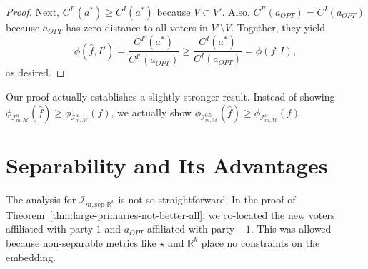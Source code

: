 \documentclass[letterpaper]{article} %
\theoremstyle{definition}
\renewcommand{\hat}{\widehat}
\newcommand{\bbR}{\mathbb{R}}
\newcommand{\calI}{\mathcal{I}}
\newcommand{\calM}{\mathcal{M}}
\newcommand{\pleft}{-1}
\newcommand{\pright}{1}
\newcommand{\all}{\star}
\newcommand{\sep}{\textrm{sep-}}
\newcommand{\euc}[1]{\bbR^{#1}}
\newcommand{\eucsep}[1]{\sep\euc{#1}}
\newcommand{\I}{\calI}
\begin{document}
\begin{proof}
	Next, $C^{I'}(a^*) \ge C^I(a^*)$ because $V \subset V'$. Also, $C^{I'}(a_{OPT}) = C^I(a_{OPT})$ because $a_{OPT}$ has zero distance to all voters in $V' \setminus V$. Together, they yield 
	\begin{equation}
	\phi(\hat{f},I') = \frac{C^{I'}(a^*)}{C^{I'}(a_{OPT})} \ge \frac{C^I(a^*)}{C^I(a_{OPT})} = \phi(f,I),
	\label{eqn:translate-worst-case}
	\end{equation}
	as desired.
%	
%	
\end{proof}

Our proof actually establishes a slightly stronger result. Instead of showing $\phi_{\I^{\alpha}_{m,\calM}}(\hat{f}) \ge \phi_{\I^{\alpha}_{m,\calM}}(f)$, we actually show $\phi_{\I^{0.5}_{m,\calM}}(\hat{f}) \ge \phi_{\I^{\alpha}_{m,\calM}}(f)$. 

\section{Separability and Its Advantages}
\label{sec:large-primaries-better-line}

The analysis for $\I_{m,\eucsep{k}}$ is not so straightforward. In the proof of Theorem~\ref{thm:large-primaries-not-better-all}, we co-located the new voters affiliated with party $\pright$ and $a_{OPT}$ affiliated with party $\pleft$. This was allowed because non-separable metrics like $\all$ and $\euc{k}$ place no constraints on the embedding. 
\end{document}
